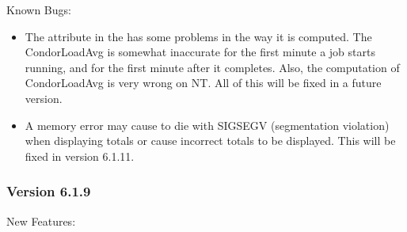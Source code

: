 \noindent Known Bugs:

\begin{itemize}

\item The  attribute in the  has
some problems in the way it is computed.
The CondorLoadAvg is somewhat inaccurate for the first minute a job
starts running, and for the first minute after it completes.
Also, the computation of CondorLoadAvg is very wrong on NT.
All of this will be fixed in a future version.

\item A memory error may cause  to die with SIGSEGV
(segmentation violation) when displaying totals or cause incorrect
totals to be displayed.  This will be fixed in version 6.1.11.

\end{itemize}


\subsubsection{\label{sec:New-6-1-9}Version 6.1.9}

\noindent New Features:

